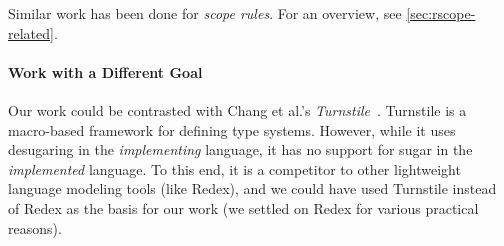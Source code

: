 Similar work has been done for \emph{scope rules}. For an overview,
see \cref{sec:rscope-related}.





\paragraph{Work with a Different Goal}

Our work could be contrasted with Chang et al.'s \emph{Turnstile}~\cite{turnstile}.
Turnstile is a macro-based framework for defining type systems.
However, while it uses desugaring in the \emph{implementing} language,
it has no support for sugar in the \emph{implemented} language. To
this end, it is a competitor to other lightweight language modeling
tools (like Redex), and we could have used Turnstile
instead of Redex as the basis for our work (we settled on Redex for
various practical reasons).

